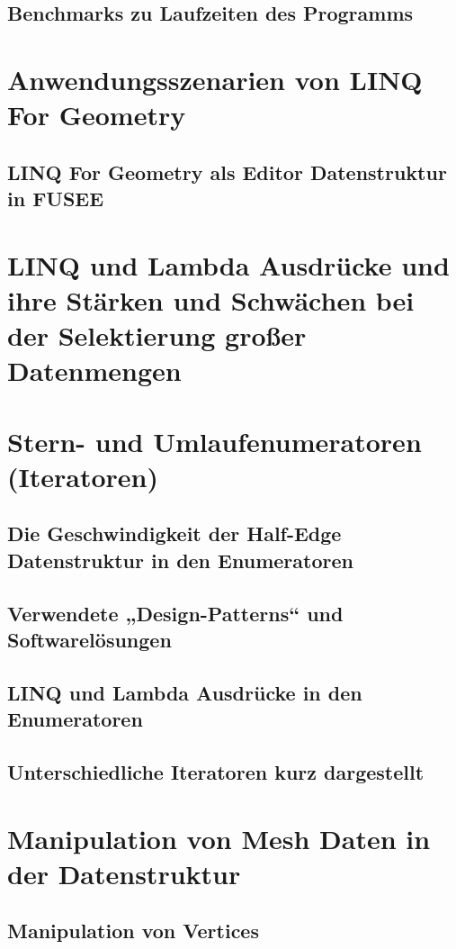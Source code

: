 \documentclass[pagesize, paper=a4, fontsize=12pt,titlepage=true, headings=small, headnosepline, abstractoff, liststotoc, nochapterprefix, plainheadsepline]{scrreprt}
\newcommand{\LFG}{LINQ For Geometry}
\newcommand{\LFGS}{LINQ For Geometry }
\begin{document}
		\subsection {Benchmarks zu Laufzeiten des Programms}
	\section {Anwendungsszenarien von \LFG}
		\subsection {\LFGS als Editor Datenstruktur in FUSEE}
	\section {LINQ und Lambda Ausdrücke und ihre Stärken und Schwächen bei der Selektierung großer Datenmengen}
	\section {Stern- und Umlaufenumeratoren (Iteratoren)}
		\subsection {Die Geschwindigkeit der Half-Edge Datenstruktur in den Enumeratoren}
		\subsection {Verwendete „Design-Patterns“ und Softwarelösungen}
		\subsection {LINQ und Lambda Ausdrücke in den Enumeratoren}
		\subsection {Unterschiedliche Iteratoren kurz dargestellt}
	\section {Manipulation von Mesh Daten in der Datenstruktur}
		\subsection {Manipulation von Vertices}
\end{document}
